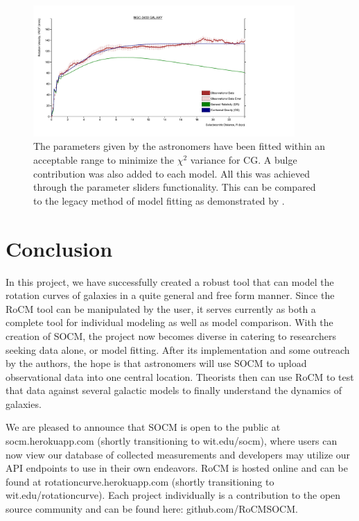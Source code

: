 \documentclass[conference]{IEEEtran-modified}
\begin{document}
\begin{figure}[h!]
\centering
\includegraphics[width=0.89\textwidth]{NGC-2403}
\caption{The parameters given by the astronomers have been fitted within an acceptable range to minimize the $\chi^2$ variance for CG. A bulge contribution was also added to each model. All this was achieved through the parameter sliders functionality. This can be compared to the legacy method of model fitting as demonstrated by \citep{mannheim}.}
\label{ngc2403plot}
\end{figure}

\newpage

\section{Conclusion}
In this project, we have successfully created a robust tool that can model the rotation curves of galaxies in a quite general and free form manner. Since the RoCM tool can be manipulated by the user, it serves currently as both a complete tool for individual modeling as well as model comparison.  With the creation of SOCM, the project now becomes diverse in catering to researchers seeking data alone, or model fitting.  After its implementation and some outreach by the authors, the hope is that astronomers will use SOCM to upload observational data into one central location. Theorists then can use RoCM to test that data against several galactic models to finally understand the dynamics of galaxies. 

We are pleased to announce that SOCM is open to the public at socm.herokuapp.com (shortly transitioning to wit.edu/socm), where users can now view our database of collected measurements and developers may utilize our API endpoints to use in their own endeavors. RoCM is hosted online and can be found at rotationcurve.herokuapp.com (shortly transitioning to wit.edu/rotationcurve). Each project individually is a contribution to the open source community and can be found here: github.com/RoCMSOCM.
\end{document}
